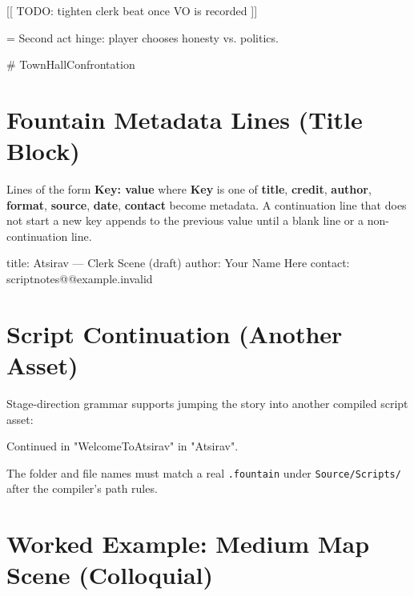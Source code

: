 \documentclass[11pt,letterpaper,oldstylefigures]{memoir}
\newcommand{\stagedir}[1]{#1\par\vspace{1\baselineskip}}
\newenvironment{FountainExample}
  {\begingroup
  \ttfamily\small
   \setlength{\parindent}{0pt}
  \setlength{\parskip}{0.5em}
  \allowdisplaybreaks
  \setlength{\displaywidowpenalty}{0}
  \setlength{\widowpenalty}{0}
  \setlength{\clubpenalty}{0}
  \setlength{\interlinepenalty}{0}
}
  {\endgroup}
\newcommand{\fountain}[1]{\textbf{#1}}
\begin{document}
\begin{FountainExample}
\stagedir{[[ TODO: tighten clerk beat once VO is recorded ]]}

\stagedir{= Second act hinge: player chooses honesty vs. politics.}

\stagedir{\# TownHallConfrontation}
\end{FountainExample}

\section{Fountain Metadata Lines (Title Block)}

Lines of the form \fountain{Key: value} where \fountain{Key} is one of \fountain{title}, \fountain{credit}, \fountain{author}, \fountain{format}, \fountain{source}, \fountain{date}, \fountain{contact} become metadata. A continuation line that does not start a new key appends to the previous value until a blank line or a non-continuation line.

\begin{FountainExample}
title: Atsirav --- Clerk Scene (draft)
author: Your Name Here
contact: scriptnotes@@example.invalid
\end{FountainExample}

\section{Script Continuation (Another Asset)}

Stage-direction grammar supports jumping the story into another compiled script asset:

\begin{FountainExample}
\stagedir{Continued in "WelcomeToAtsirav" in "Atsirav".}
\end{FountainExample}

\noindent The folder and file names must match a real \texttt{.fountain} under \texttt{Source/Scripts/} after the compiler's path rules.

\section{Worked Example: Medium Map Scene (Colloquial)}
\end{document}
